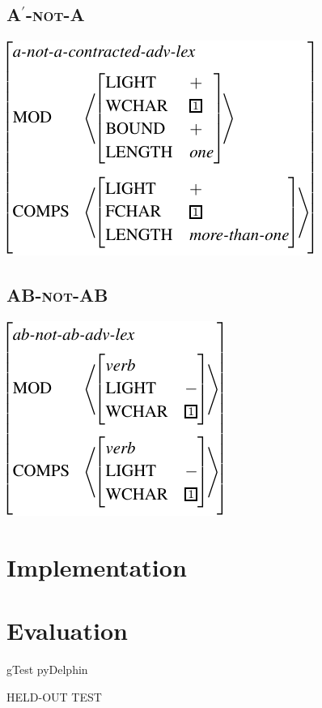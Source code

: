 \documentclass[11pt]{article}
\begin{document}
\subsection{\textsc{A\ensuremath{^\prime}-not-A}}
\label{ssec:contracted}




{\small 
\ex{}
\vspace{-10pt}
\newline
\includegraphics[scale=.8]{pdf/contracted.pdf}
\xe}
\vspace{-20pt}



\subsection{\textsc{AB-not-AB}}
\label{ssec:phrasal}




{\small 
\ex{}
\vspace{-10pt}
\newline
\includegraphics[scale=.8]{pdf/ab.pdf}
\xe}
\vspace{-20pt}


\section{Implementation}
\label{sec:implemetation}


\section{Evaluation}
\label{sec:evaluation}

gTest 
pyDelphin


HELD-OUT
TEST











\end{document}

